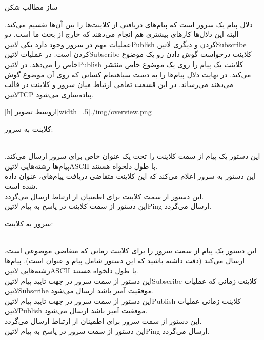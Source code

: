 \documentclass[]{article}
\begin{document}
  ‌ساز
  ‌مطالب
  ‌شکن


  دلال پیام یک سرور است که پیام‌های دریافتی از کلاینت‌ها را بین آن‌ها تقسیم می‌کند. البته این دلال‌ها کارهای بیشتری هم انجام می‌دهند که خارج از بحث ما است.
  دو عملیات مهم در سرور وجود دارد یکی ‌لاتین{Publish} کردن و دیگری ‌لاتین{Subscribe} کردن است. در عملیات ‌لاتین{Subscribe} کلاینت درخواست گوش دادن رو یک موضوع خاص را می‌دهد.
  در ‌لاتین{Publish} کلاینت یک پیام را روی یک موضوع خاص منتشر می‌کند. در نهایت دلال پیام‌ها را به دست ‌سیاه{تمام} کسانی که روی آن موضوع گوش می‌دهند می‌رساند.
  در این قسمت تمامی ارتباط میان سرور و کلاینت در قالب ‌لاتین{TCP} پیاده‌سازی می‌شود.

  [h]
  ‌ازوسط
  ‌تصویر[width=.5\textwidth]{./img/overview.png}


  کلاینت به سرور:

    \\ این دستور یک پیام از سمت کلاینت را تحت یک عنوان خاص برای سرور ارسال می‌کند. پیام‌ها رشته‌هایی ‌لاتین{ASCII} با طول دلخواه هستند.
    \\ این دستور به سرور اعلام می‌کند که این کلاینت متقاضی دریافت پیام‌های، عنوان داده شده است.
    \\ این دستور از سمت کلاینت برای اطمنیان از ارتباط ارسال می‌گردد.
    \\ این دستور از سمت کلاینت در پاسخ به پیام ‌لاتین{Ping} ارسال می‌گردد.

  سرور به کلاینت:

    \\ این دستور یک پیام از سمت سرور را برای کلاینت زمانی که متقاضی موضوعی است، ارسال می‌کند (دقت داشته باشید که این دستور شامل پیام و عنوان است). پیام‌ها رشته‌هایی ‌لاتین{ASCII} با طول دلخواه هستند.
    \\ این دستور از سمت سرور در جهت تایید پیام ‌لاتین{Subscribe} کلاینت زمانی که عملیات ‌لاتین{Subscribe} موفقیت آمیز باشد ارسال می‌شود.
    \\ این دستور از سمت سرور در جهت تایید پیام ‌لاتین{Publish} کلاینت زمانی عملیات ‌لاتین{Publish} موفقیت آمیز باشد ارسال می‌شود.
    \\ این دستور از سمت سرور برای اطمینان از ارتباط ارسال می‌گردد.
    \\ این دستور از سمت سرور در پاسخ به پیام ‌لاتین{Ping} ارسال می‌گردد.
\end{document}
